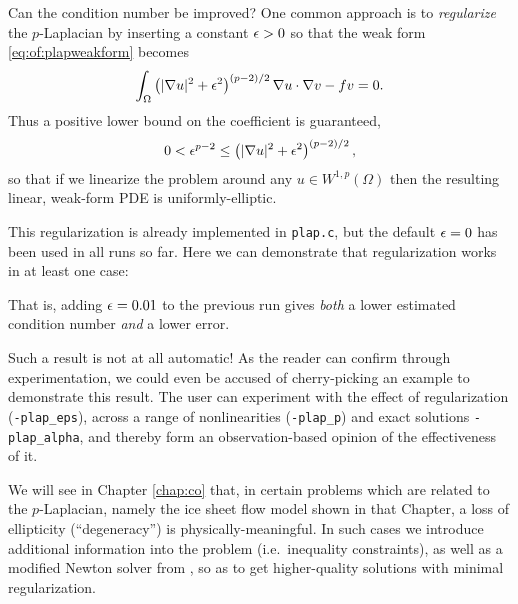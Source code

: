 Can the condition number be improved?  One common approach is to \emph{regularize} the $p$-Laplacian by inserting a constant $\epsilon>0$ so that the weak form \eqref{eq:of:plapweakform} becomes
\begin{equation}
\int_\Omega \left(|\nabla u|^2+\epsilon^2\right)^{(p-2)/2} \nabla u \cdot \nabla v - f v = 0. \label{eq:of:plapweakformreg}
\end{equation}
Thus a positive lower bound on the coefficient is guaranteed,
     $$0 < \epsilon^{p-2} \le \left(|\nabla u|^2+\epsilon^2\right)^{(p-2)/2},$$
so that if we linearize the problem around any $u\in W^{1,p}(\Omega)$ then the resulting linear, weak-form PDE is uniformly-elliptic.

This regularization is already implemented in \texttt{plap.c}, but the default $\eps=0$ has been used in all runs so far.  Here we can demonstrate that regularization works in at least one case:
That is, adding $$ to the previous run gives \emph{both} a lower estimated condition number \emph{and} a lower error.

Such a result is not at all automatic!  As the reader can confirm through experimentation,  we could even be accused of cherry-picking an example to demonstrate this result.  The user can experiment with the effect of regularization (\texttt{-plap\_eps}), across a range of nonlinearities (\texttt{-plap\_p}) and exact solutions \texttt{-plap\_alpha}, and thereby form an observation-based opinion of the effectiveness of it. 

We will see in Chapter \ref{chap:co} that, in certain problems which are related to the $p$-Laplacian, namely the ice sheet flow model shown in that Chapter, a loss of ellipticity (``degeneracy'') is physically-meaningful.  In such cases we introduce additional information into the problem (i.e.~inequality constraints), as well as a modified Newton solver from \PETSc, so as to get higher-quality solutions with minimal regularization.


